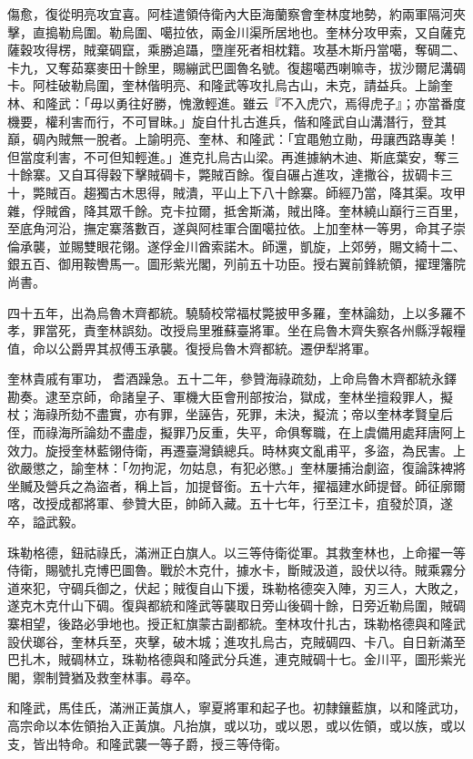 \begin{pinyinscope}
傷愈，復從明亮攻宜喜。阿桂遣領侍衛內大臣海蘭察會奎林度地勢，約兩軍隔河夾擊，直搗勒烏圍。勒烏圍、噶拉依，兩金川渠所居地也。奎林分攻甲索，又自薩克薩穀攻得楞，賊棄碉竄，乘勝追躡，墮崖死者相枕籍。攻基木斯丹當噶，奪碉二、卡九，又奪茹寨麥田十餘里，賜繃武巴圖魯名號。復趨噶西喇嘛寺，拔沙爾尼溝碉卡。阿桂破勒烏圍，奎林偕明亮、和隆武等攻扎烏古山，未克，請益兵。上諭奎林、和隆武：「毋以勇往好勝，愧激輕進。雖云『不入虎穴，焉得虎子』；亦當番度機要，權利害而行，不可冒昧。」旋自什扎古進兵，偕和隆武自山溝潛行，登其巔，碉內賊無一脫者。上諭明亮、奎林、和隆武：「宜黽勉立勛，毋讓西路專美！但當度利害，不可但知輕進。」進克扎烏古山梁。再進據納木迪、斯底葉安，奪三十餘寨。又自耳得穀下擊賊碉卡，斃賊百餘。復自碾占進攻，達撒谷，拔碉卡三十，斃賊百。趨獨古木思得，賊潰，平山上下八十餘寨。師經乃當，降其渠。攻甲雜，俘賊酋，降其眾千餘。克卡拉爾，抵舍斯滿，賊出降。奎林繞山巔行三百里，至底角河沿，撫定寨落數百，遂與阿桂軍合圍噶拉依。上加奎林一等男，命其子崇倫承襲，並賜雙眼花翎。遂俘金川酋索諾木。師還，凱旋，上郊勞，賜文綺十二、銀五百、御用鞍轡馬一。圖形紫光閣，列前五十功臣。授右翼前鋒統領，擢理籓院尚書。

四十五年，出為烏魯木齊都統。驍騎校常福杖斃披甲多羅，奎林論劾，上以多羅不孝，罪當死，責奎林誤劾。改授烏里雅蘇臺將軍。坐在烏魯木齊失察各州縣浮報糧值，命以公爵畀其叔傅玉承襲。復授烏魯木齊都統。遷伊犁將軍。

奎林貴戚有軍功，耆酒躁急。五十二年，參贊海祿疏劾，上命烏魯木齊都統永鐸勘奏。逮至京師，命諸皇子、軍機大臣會刑部按治，獄成，奎林坐擅殺罪人，擬杖；海祿所劾不盡實，亦有罪，坐誣告，死罪，未決，擬流；帝以奎林孝賢皇后侄，而祿海所論劾不盡虛，擬罪乃反重，失平，命俱奪職，在上虞備用處拜唐阿上效力。旋授奎林藍翎侍衛，再遷臺灣鎮總兵。時林爽文亂甫平，多盜，為民害。上欲嚴懲之，諭奎林：「勿拘泥，勿姑息，有犯必懲。」奎林屢捕治劇盜，復論誅裨將坐贓及營兵之為盜者，稱上旨，加提督銜。五十六年，擢福建水師提督。師征廓爾喀，改授成都將軍、參贊大臣，帥師入藏。五十七年，行至江卡，疽發於頂，遂卒，謚武毅。

珠勒格德，鈕祜祿氏，滿洲正白旗人。以三等侍衛從軍。其救奎林也，上命擢一等侍衛，賜號扎克博巴圖魯。戰於木克什，據水卡，斷賊汲道，設伏以待。賊乘霧分道來犯，守碉兵御之，伏起；賊復自山下援，珠勒格德突入陣，刃三人，大敗之，遂克木克什山下碉。復與都統和隆武等襲取日旁山後碉十餘，日旁近勒烏圍，賊碉寨相望，後路必爭地也。授正紅旗蒙古副都統。奎林攻什扎古，珠勒格德與和隆武設伏瑯谷，奎林兵至，夾擊，破木城；進攻扎烏古，克賊碉四、卡八。自日新滿至巴扎木，賊碉林立，珠勒格德與和隆武分兵進，連克賊碉十七。金川平，圖形紫光閣，禦制贊猶及救奎林事。尋卒。

和隆武，馬佳氏，滿洲正黃旗人，寧夏將軍和起子也。初隸鑲藍旗，以和隆武功，高宗命以本佐領抬入正黃旗。凡抬旗，或以功，或以恩，或以佐領，或以族，或以支，皆出特命。和隆武襲一等子爵，授三等侍衛。


\end{pinyinscope}
